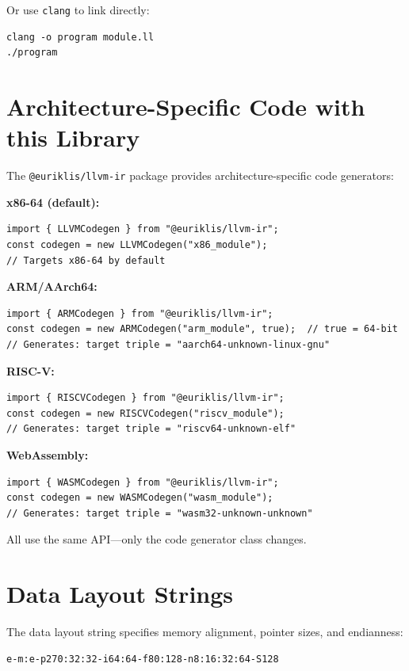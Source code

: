 \documentclass[11pt,oneside]{book}
\begin{document}
Or use \texttt{clang} to link directly:
\begin{lstlisting}[style=ir]
clang -o program module.ll
./program
\end{lstlisting}

\section{Architecture-Specific Code with this Library}

The \texttt{@euriklis/llvm-ir} package provides architecture-specific code generators:

\textbf{x86-64 (default):}
\begin{lstlisting}[style=ts]
import { LLVMCodegen } from "@euriklis/llvm-ir";
const codegen = new LLVMCodegen("x86_module");
// Targets x86-64 by default
\end{lstlisting}

\textbf{ARM/AArch64:}
\begin{lstlisting}[style=ts]
import { ARMCodegen } from "@euriklis/llvm-ir";
const codegen = new ARMCodegen("arm_module", true);  // true = 64-bit
// Generates: target triple = "aarch64-unknown-linux-gnu"
\end{lstlisting}

\textbf{RISC-V:}
\begin{lstlisting}[style=ts]
import { RISCVCodegen } from "@euriklis/llvm-ir";
const codegen = new RISCVCodegen("riscv_module");
// Generates: target triple = "riscv64-unknown-elf"
\end{lstlisting}

\textbf{WebAssembly:}
\begin{lstlisting}[style=ts]
import { WASMCodegen } from "@euriklis/llvm-ir";
const codegen = new WASMCodegen("wasm_module");
// Generates: target triple = "wasm32-unknown-unknown"
\end{lstlisting}

All use the same API—only the code generator class changes.

\section{Data Layout Strings}

The data layout string specifies memory alignment, pointer sizes, and endianness:

\begin{lstlisting}[style=ir]
e-m:e-p270:32:32-i64:64-f80:128-n8:16:32:64-S128
\end{lstlisting}
\end{document}
